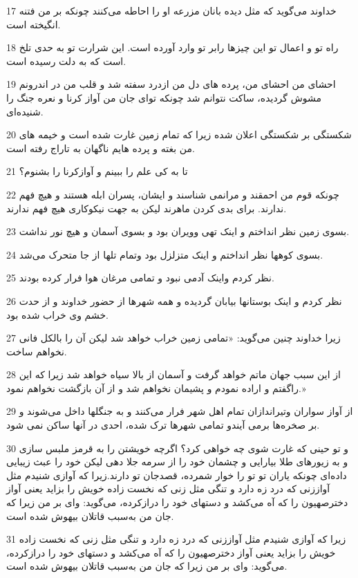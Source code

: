\par 17 خداوند می‌گوید که مثل دیده بانان مزرعه او را احاطه می‌کنند چونکه بر من فتنه انگیخته است.
\par 18 راه تو و اعمال تو این چیزها رابر تو وارد آورده است. این شرارت تو به حدی تلخ است که به دلت رسیده است.
\par 19 احشای من احشای من، پرده های دل من ازدرد سفته شد و قلب من در اندرونم مشوش گردیده، ساکت نتوانم شد چونکه تو‌ای جان من آواز کرنا و نعره جنگ را شنیده‌ای.
\par 20 شکستگی بر شکستگی اعلان شده زیرا که تمام زمین غارت شده است و خیمه های من بغته و پرده هایم ناگهان به تاراج رفته است.
\par 21 تا به کی علم را ببینم و آوازکرنا را بشنوم؟
\par 22 چونکه قوم من احمقند و مرانمی شناسند و ایشان، پسران ابله هستند و هیچ فهم ندارند. برای بدی کردن ماهرند لیکن به جهت نیکوکاری هیچ فهم ندارند.
\par 23 بسوی زمین نظر انداختم و اینک تهی وویران بود و بسوی آسمان و هیچ نور نداشت.
\par 24 بسوی کوهها نظر انداختم و اینک متزلزل بود وتمام تلها از جا متحرک می‌شد.
\par 25 نظر کردم واینک آدمی نبود و تمامی مرغان هوا فرار کرده بودند.
\par 26 نظر کردم و اینک بوستانها بیابان گردیده و همه شهرها از حضور خداوند و از حدت خشم وی خراب شده بود.
\par 27 زیرا خداوند چنین می‌گوید: «تمامی زمین خراب خواهد شد لیکن آن را بالکل فانی نخواهم ساخت.
\par 28 از این سبب جهان ماتم خواهد گرفت و آسمان از بالا سیاه خواهد شد زیرا که این راگفتم و اراده نمودم و پشیمان نخواهم شد و از آن بازگشت نخواهم نمود.»
\par 29 از آواز سواران وتیراندازان تمام اهل شهر فرار می‌کنند و به جنگلها داخل می‌شوند و بر صخره‌ها برمی آیندو تمامی شهرها ترک شده، احدی در آنها ساکن نمی شود.
\par 30 و تو حینی که غارت شوی چه خواهی کرد؟ اگر‌چه خویشتن را به قرمز ملبس سازی و به زیورهای طلا بیارایی و چشمان خود را از سرمه جلا دهی لیکن خود را عبث زیبایی داده‌ای چونکه یاران تو تو را خوار شمرده، قصدجان تو دارند.زیرا که آوازی شنیدم مثل آواززنی که درد زه دارد و تنگی مثل زنی که نخست زاده خویش را بزاید یعنی آواز دخترصهیون را که آه می‌کشد و دستهای خود را درازکرده، می‌گوید: وای بر من زیرا که جان من به‌سبب قاتلان بیهوش شده است.
\par 31 زیرا که آوازی شنیدم مثل آواززنی که درد زه دارد و تنگی مثل زنی که نخست زاده خویش را بزاید یعنی آواز دخترصهیون را که آه می‌کشد و دستهای خود را درازکرده، می‌گوید: وای بر من زیرا که جان من به‌سبب قاتلان بیهوش شده است.
 

